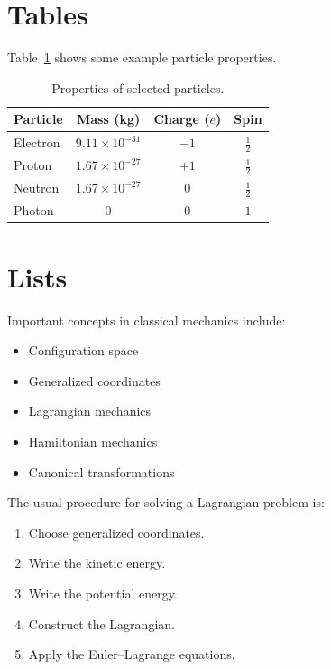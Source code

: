 \documentclass[12pt,a4paper]{article}
\begin{document}
	\section{Tables}
	
	Table~\ref{tab:particles} shows some example particle properties.
	
	\begin{table}[ht]
		\centering
		\caption{Properties of selected particles.}
		\label{tab:particles}
		
		\begin{tabular}{lccc}
			\toprule
			Particle & Mass (\si{\kilo\gram}) &
			Charge ($e$) & Spin \\
			\midrule
			Electron & $9.11\times10^{-31}$ & $-1$ &
			$\frac12$ \\
			Proton   & $1.67\times10^{-27}$ & $+1$ &
			$\frac12$ \\
			Neutron  & $1.67\times10^{-27}$ & $0$ &
			$\frac12$ \\
			Photon   & $0$ & $0$ & $1$ \\
			\bottomrule
		\end{tabular}
	\end{table}
	
	\section{Lists}
	
	Important concepts in classical mechanics include:
	
	\begin{itemize}
		\item Configuration space
		\item Generalized coordinates
		\item Lagrangian mechanics
		\item Hamiltonian mechanics
		\item Canonical transformations
	\end{itemize}
	
	The usual procedure for solving a Lagrangian problem is:
	
	\begin{enumerate}
		\item Choose generalized coordinates.
		\item Write the kinetic energy.
		\item Write the potential energy.
		\item Construct the Lagrangian.
		\item Apply the Euler--Lagrange equations.
	\end{enumerate}
	
\end{document}
